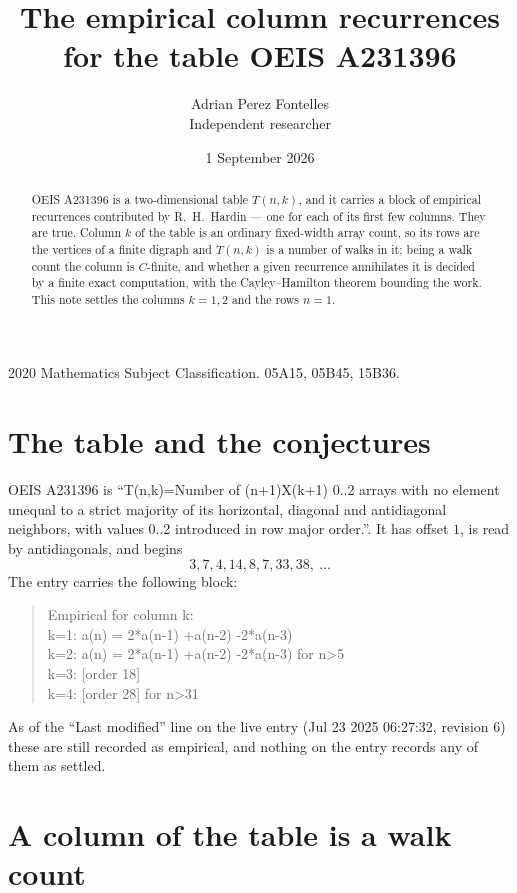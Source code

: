 \documentclass[11pt,a4paper]{article}
\title{The empirical column recurrences for the table OEIS A231396}
\author{Adrian Perez Fontelles\\ \small Independent researcher}
\date{1 September 2026}
\theoremstyle{plain}
\theoremstyle{definition}
\begin{document}
\maketitle

\begin{abstract}
OEIS A231396 is a two-dimensional table $T(n,k)$, and it carries a block of empirical
recurrences contributed by R.~H.~Hardin --- one for each of its first few columns. They are
true. Column $k$ of the table is an ordinary fixed-width array count, so its rows are the
vertices of a finite digraph and $T(n,k)$ is a number of walks in it; being a walk count the
column is $C$-finite, and whether a given recurrence annihilates it is decided by a finite
exact computation, with the Cayley--Hamilton theorem bounding the work. This note settles the columns $k=1, 2$ and the rows $n=1$.
\end{abstract}

\noindent\small 2020 Mathematics Subject Classification. 05A15, 05B45, 15B36.\normalsize

\section{The table and the conjectures}

OEIS A231396 is ``T(n,k)=Number of (n+1)X(k+1) 0..2 arrays with no element unequal to a strict majority of its horizontal, diagonal and antidiagonal neighbors, with values 0..2 introduced in row major order.''. It has offset $1$, is
read by antidiagonals, and begins
\[
3, 7, 4, 14, 8, 7, 33, 38,\ \dots
\]
The entry carries the following block:
\begin{quote}\small
Empirical for column k:\\
k=1: a(n) = 2*a(n-1) +a(n-2) -2*a(n-3)\\
k=2: a(n) = 2*a(n-1) +a(n-2) -2*a(n-3) for n>5\\
k=3: [order 18]\\
k=4: [order 28] for n>31\\
\end{quote}
As of the ``Last modified'' line on the live entry (Jul 23 2025 06:27:32, revision 6) these are still
recorded as empirical, and nothing on the entry records any of them as settled.

\section{A column of the table is a walk count}
\end{document}
